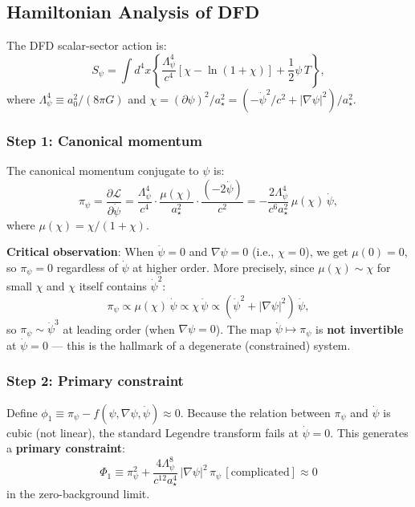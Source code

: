 \documentclass[11pt,a4paper]{article}
\begin{document}
\subsection{Hamiltonian Analysis of DFD}
\label{sec:hamiltonian}

The DFD scalar-sector action is:
\begin{equation}
S_\psi = \int d^4x \left\{\frac{\Lambda_\psi^4}{c^4}\left[\chi - \ln(1+\chi)\right] + \frac{1}{2}\psi\,T\right\},
\end{equation}
where $\Lambda_\psi^4 \equiv a_0^2/(8\pi G)$ and $\chi = (\partial\psi)^2/a_\star^2 = (-\dot\psi^2/c^2 + |\nabla\psi|^2)/a_\star^2$.

\subsubsection{Step 1: Canonical momentum}

The canonical momentum conjugate to $\psi$ is:
\begin{equation}
\pi_\psi = \frac{\partial\mathcal{L}}{\partial\dot\psi} = \frac{\Lambda_\psi^4}{c^4}\cdot\frac{\mu(\chi)}{a_\star^2}\cdot\frac{(-2\dot\psi)}{c^2}
= -\frac{2\Lambda_\psi^4}{c^6 a_\star^2}\,\mu(\chi)\,\dot\psi,
\end{equation}
where $\mu(\chi) = \chi/(1+\chi)$.

\textbf{Critical observation}: When $\dot\psi = 0$ and $\nabla\psi = 0$ (i.e., $\chi = 0$), we get $\mu(0) = 0$, so $\pi_\psi = 0$ regardless of $\dot\psi$ at higher order. More precisely, since $\mu(\chi) \sim \chi$ for small $\chi$ and $\chi$ itself contains $\dot\psi^2$:
\begin{equation}
\pi_\psi \propto \mu(\chi)\,\dot\psi \propto \chi\,\dot\psi \propto (\dot\psi^2 + |\nabla\psi|^2)\,\dot\psi,
\end{equation}
so $\pi_\psi \sim \dot\psi^3$ at leading order (when $\nabla\psi = 0$). The map $\dot\psi \mapsto \pi_\psi$ is \textbf{not invertible} at $\dot\psi = 0$ --- this is the hallmark of a degenerate (constrained) system.

\subsubsection{Step 2: Primary constraint}

Define $\phi_1 \equiv \pi_\psi - f(\psi, \nabla\psi, \dot\psi) \approx 0$. Because the relation between $\pi_\psi$ and $\dot\psi$ is cubic (not linear), the standard Legendre transform fails at $\dot\psi = 0$. This generates a \textbf{primary constraint}:
\begin{equation}\label{eq:primary-constraint}
\Phi_1 \equiv \pi_\psi^2 + \frac{4\Lambda_\psi^8}{c^{12}a_\star^4}\,|\nabla\psi|^2\,\pi_\psi\,[\text{complicated}] \approx 0
\end{equation}
in the zero-background limit.
\end{document}
